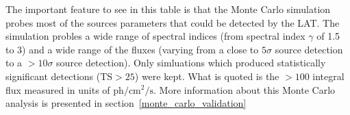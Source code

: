 \documentclass[preprint]{aastex}
\newcommand{\mev}{\text{MeV}\xspace}
\newcommand{\s}{\text{s}\xspace}
\newcommand{\ph}{\text{ph}\xspace}
\newcommand{\cm}{\text{cm}\xspace}
\newcommand{\ts}{\text{TS}\xspace}
\begin{document}
\begin{table}
\begin{centering}
{    The important feature to see in this table is that the Monte Carlo
    simulation probes most of the sources parameters that could be detected
    by the LAT.  The simulation probles a wide range of spectral indices
    (from spectral index $\gamma$ of 1.5 to 3) and a wide range of the fluxes
    (varying from a close to $5\sigma$ source detection to a $>10\sigma$
    source detection).  Only simluations which produced statistically
    significant detections ($\ts>25$) were kept.  What is quoted is the
    $>100$ \mev integral flux measured in units of $\ph/\cm^2/\s$.
    More information about this Monte Carlo analysis is presented in
    section~\ref{monte_carlo_validation}
    }
    \label{ts_ext_num_sims}
  \end{centering}
\end{table}

\clearpage
\end{document}
